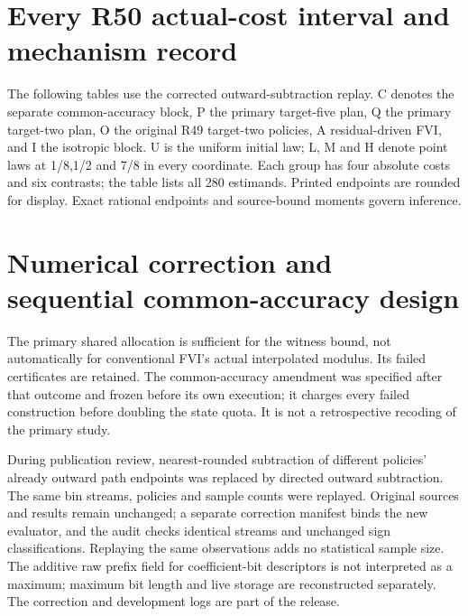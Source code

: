 \documentclass[ecta,nameyear,draft]{econsocart}
\begin{document}
\section{Every R50 actual-cost interval and mechanism record}\label{supp:records50}
The following tables use the corrected outward-subtraction replay. C denotes the separate common-accuracy block, P the primary target-five plan, Q the primary target-two plan, O the original R49 target-two policies, A residual-driven FVI, and I the isotropic block. U is the uniform initial law; L, M and H denote point laws at 1/8,1/2 and 7/8 in every coordinate. Each group has four absolute costs and six contrasts; the table lists all 280 estimands. Printed endpoints are rounded for display. Exact rational endpoints and source-bound moments govern inference.





\section{Numerical correction and sequential common-accuracy design}\label{supp:corrections50}
The primary shared allocation is sufficient for the witness bound, not automatically for conventional FVI's actual interpolated modulus. Its failed certificates are retained. The common-accuracy amendment was specified after that outcome and frozen before its own execution; it charges every failed construction before doubling the state quota. It is not a retrospective recoding of the primary study.

During publication review, nearest-rounded subtraction of different policies' already outward path endpoints was replaced by directed outward subtraction. The same bin streams, policies and sample counts were replayed. Original sources and results remain unchanged; a separate correction manifest binds the new evaluator, and the audit checks identical streams and unchanged sign classifications. Replaying the same observations adds no statistical sample size. The additive raw prefix field for coefficient-bit descriptors is not interpreted as a maximum; maximum bit length and live storage are reconstructed separately. The correction and development logs are part of the release.


\end{document}
